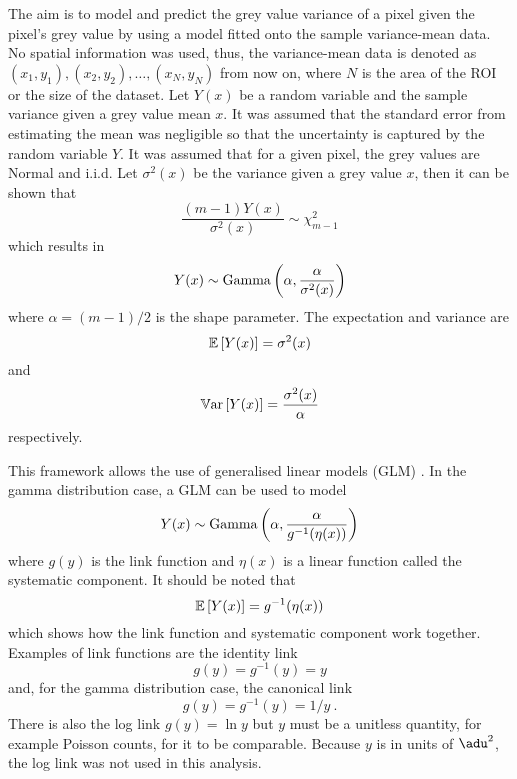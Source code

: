 The aim is to model and predict the grey value variance of a pixel given the pixel's grey value by using a model fitted onto the sample variance-mean data. No spatial information was used, thus, the variance-mean data is denoted as $(x_1,y_1),(x_2,y_2),\dotsc,(x_N,y_N)$ from now on, where $N$ is the area of the ROI or the size of the dataset. Let $Y(x)$ be a random variable and the sample variance given a grey value mean $x$. It was assumed that the standard error from estimating the mean was negligible so that the uncertainty is captured by the random variable $Y$. It was assumed that for a given pixel, the grey values are Normal and i.i.d. Let $\sigma^2(x)$ be the variance given a grey value $x$, then it can be shown that
\begin{equation}
\dfrac{(m-1)Y(x)}{\sigma^2(x)}\sim\chi^2_{m-1}
\end{equation}
which results in
\begin{equation}
Y(x)\sim\operatorname{Gamma}\left(\alpha,\dfrac{\alpha}{\sigma^2(x)}\right)
\end{equation}
where $\alpha=(m-1)/2$ is the shape parameter. The expectation and variance are
\begin{equation}
\operatorname{\mathbb{E}}\left[Y(x)\right]=\sigma^2(x)
\end{equation}
and
\begin{equation}
\operatorname{\mathbb{V}ar}\left[Y(x)\right]=\dfrac{\sigma^2(x)}{\alpha}
\end{equation}
respectively.

This framework allows the use of generalised linear models (GLM) \citep{nelder1972generalized,nelder1972generalized_2, mccullagh1984generalized}. In the gamma distribution case, a GLM can be used to model
\begin{equation}
Y(x)\sim\operatorname{Gamma}\left(\alpha,\dfrac{\alpha}{g^{-1}(\eta(x))}\right)
\end{equation}
where $g(y)$ is the link function and $\eta(x)$ is a linear function called the systematic component. It should be noted that
\begin{equation}
  \operatorname{\mathbb{E}}\left[Y(x)\right]=g^{-1}(\eta(x))
\end{equation}
which shows how the link function and systematic component work together. Examples of link functions are the identity link
\begin{equation}
g(y)=g^{-1}(y)=y
\end{equation}
and, for the gamma distribution case, the canonical link
\begin{equation}
g(y)=g^{-1}(y)=1/y \ .
\end{equation}
There is also the log link $g(y)=\ln y$ but $y$ must be a unitless quantity, for example Poisson counts, for it to be comparable. Because $y$ is in units of $\SI{}{\adu^2}$, the log link was not used in this analysis.

